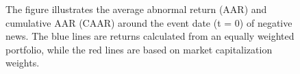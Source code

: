 \begin{figure}
\begin{minipage}[b]{0.49\textwidth}
    \label{fig:ST_pos_sensitivity_nasdaq}
     \end{minipage}
        \caption*{\footnotesize The figure illustrates the average abnormal return (AAR) and cumulative AAR (CAAR) around the event date (t = 0) of negative news. The blue lines are returns calculated from an equally weighted portfolio, while the red lines are based on market capitalization weights.}
        
        \label{fig:three graphs}
\end{figure}
